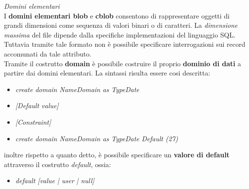 \documentclass{article}
\begin{document}
\textit{Domini elementari}\\ I \textbf{domini elementari blob} e \textbf{cblob} consentono di rappresentare oggetti di grandi dimensioni come sequenza di valori binari o di caratteri. La \textit{dimensione massima} del file dipende dalla specifiche implementazioni del linguaggio SQL. Tuttavia tramite tale formato non è possibile specificare interrogazioni sui record accomunati da tale attributo.\vspace*{14pt}\\
Tramite il costrutto \textbf{domain} è possibile costruire il proprio \textbf{dominio di dati} a partire dai domini elementari. La sintassi risulta essere cosi descritta:
\begin{itemize}[label={ }, leftmargin=1cm]
    \item \textit{create domain NameDomain as TypeDate}
\end{itemize}
\begin{itemize}[label={ }, leftmargin=2cm]
    \itemsep0em
    \item \textit{[Default value]}
    \item \textit{[Constraint]}
\end{itemize}
\begin{itemize}[label={ }, leftmargin=1cm]
    \item \textit{create domain NameDomain as TypeDate Default (27)}  
\end{itemize}
inoltre rispetto a quanto detto, è possibile specificare un \textbf{valore di default} attraverso il costrutto \textit{default}, ossia:
\begin{itemize}[label={ }, leftmargin=1cm]
    \item \textit{default [value | user | null]}
\end{itemize}
\end{document}
